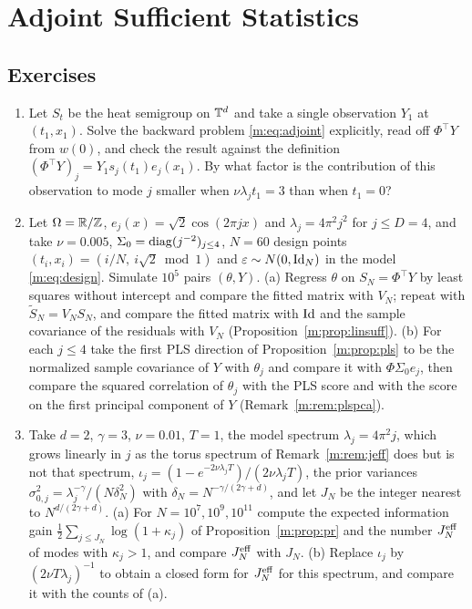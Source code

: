 \chapter{Adjoint Sufficient Statistics}
\label{ch:adjoint}





\section*{Exercises}
\begin{enumerate}
\item Let $S_t$ be the heat semigroup on $\mathbb{T}^d$ and take a single observation $Y_1$ at $(t_1,x_1)$. Solve the backward problem \eqref{m:eq:adjoint} explicitly, read off $\Phi^\top Y$ from $w(0)$, and check the result against the definition $(\Phi^\top Y)_j=Y_1s_j(t_1)e_j(x_1)$. By what factor is the contribution of this observation to mode $j$ smaller when $\nu\lambda_jt_1=3$ than when $t_1=0$?
\item Let $\Omega=\mathbb{R}/\mathbb{Z}$, $e_j(x)=\sqrt2\cos(2\pi jx)$ and $\lambda_j=4\pi^2j^2$ for $j\le D=4$, and take $\nu=0.005$, $\Sigma_0=\operatorname{diag}(j^{-2})_{j\le4}$, $N=60$ design points $(t_i,x_i)=(i/N,\ i\sqrt2\bmod1)$ and $\varepsilon\sim N(0,\operatorname{Id}_N)$ in the model \eqref{m:eq:design}. Simulate $10^5$ pairs $(\theta,Y)$. (a) Regress $\theta$ on $S_N=\Phi^\top Y$ by least squares without intercept and compare the fitted matrix with $V_N$; repeat with $\tilde S_N=V_NS_N$, and compare the fitted matrix with $\operatorname{Id}$ and the sample covariance of the residuals with $V_N$ (Proposition~\ref{m:prop:linsuff}). (b) For each $j\le4$ take the first PLS direction of Proposition~\ref{m:prop:pls} to be the normalized sample covariance of $Y$ with $\theta_j$ and compare it with $\Phi\Sigma_0e_j$, then compare the squared correlation of $\theta_j$ with the PLS score and with the score on the first principal component of $Y$ (Remark~\ref{m:rem:plspca}).
\item Take $d=2$, $\gamma=3$, $\nu=0.01$, $T=1$, the model spectrum $\lambda_j=4\pi^2j$, which grows linearly in $j$ as the torus spectrum of Remark~\ref{m:rem:jeff} does but is not that spectrum, $\iota_j=(1-e^{-2\nu\lambda_jT})/(2\nu\lambda_jT)$, the prior variances $\sigma^2_{0,j}=\lambda_j^{-\gamma}/(N\delta_N^2)$ with $\delta_N=N^{-\gamma/(2\gamma+d)}$, and let $J_N$ be the integer nearest to $N^{d/(2\gamma+d)}$. (a) For $N=10^7,10^9,10^{11}$ compute the expected information gain $\tfrac12\sum_{j\le J_N}\log(1+\kappa_j)$ of Proposition~\ref{m:prop:pr} and the number $J^{\rm eff}_N$ of modes with $\kappa_j>1$, and compare $J^{\rm eff}_N$ with $J_N$. (b) Replace $\iota_j$ by $(2\nu T\lambda_j)^{-1}$ to obtain a closed form for $J^{\rm eff}_N$ for this spectrum, and compare it with the counts of (a).

\end{enumerate}
